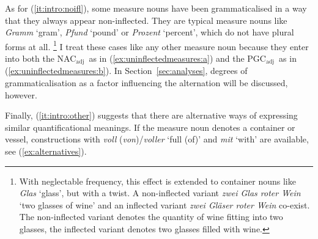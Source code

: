 \documentclass[USenglish]{article}
\newcommand{\Sub}[1]{\ensuremath{\mathrm{_{#1}}}}
\newcommand{\NACa}{NAC\Sub{adj}}
\newcommand{\PGCa}{PGC\Sub{adj}}
\begin{document}
As for (\ref{it:intro:noifl}), some measure nouns have been grammaticalised in a way that they always appear non-inflected.
They are typical measure nouns like \textit{Gramm} `gram', \textit{Pfund} `pound' or \textit{Prozent} `percent', which do not have plural forms at all.%
\footnote{With neglectable frequency, this effect is extended to container nouns like \textit{Glas} `glass', but with a twist.
A non-inflected variant \textit{zwei Glas roter Wein} `two glasses of wine' and an inflected variant \textit{zwei Gläser roter Wein} co-exist.
The non-inflected variant denotes the quantity of wine fitting into two glasses, the inflected variant denotes two glasses filled with wine.}
I treat these cases like any other measure noun because they enter into both the \NACa\ as in (\ref{ex:uninflectedmeasures:a}) and the \PGCa\ as in (\ref{ex:uninflectedmeasures:b}).
In Section~\ref{sec:analyses}, degrees of grammaticalisation as a factor influencing the alternation will be discussed, however. 

\begin{exe}
  \ex\label{ex:uninflectedmeasures}
  \begin{xlist}
  \end{xlist}
\end{exe}

Finally, (\ref{it:intro:other}) suggests that there are alternative ways of expressing similar quantificational meanings.
%
%
If the measure noun denotes a container or vessel, constructions with \textit{voll} (\textit{von})\slash\textit{voller} `full (of)' and \textit{mit} `with' are available, see (\ref{ex:alternatives}).
\end{document}
